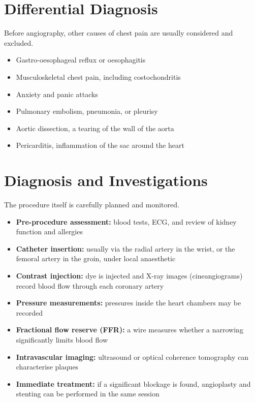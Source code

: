 \section*{Differential Diagnosis}
Before angiography, other causes of chest pain are usually considered and excluded.

\begin{itemize}
    \item Gastro-oesophageal reflux or oesophagitis
    \item Musculoskeletal chest pain, including costochondritis
    \item Anxiety and panic attacks
    \item Pulmonary embolism, pneumonia, or pleurisy
    \item Aortic dissection, a tearing of the wall of the aorta
    \item Pericarditis, inflammation of the sac around the heart
\end{itemize}

\section*{Diagnosis and Investigations}
The procedure itself is carefully planned and monitored.

\begin{itemize}
    \item \textbf{Pre-procedure assessment:} blood tests, ECG, and review of kidney function and allergies
    \item \textbf{Catheter insertion:} usually via the radial artery in the wrist, or the femoral artery in the groin, under local anaesthetic
    \item \textbf{Contrast injection:} dye is injected and X-ray images (cineangiograms) record blood flow through each coronary artery
    \item \textbf{Pressure measurements:} pressures inside the heart chambers may be recorded
    \item \textbf{Fractional flow reserve (FFR):} a wire measures whether a narrowing significantly limits blood flow
    \item \textbf{Intravascular imaging:} ultrasound or optical coherence tomography can characterise plaques
    \item \textbf{Immediate treatment:} if a significant blockage is found, angioplasty and stenting can be performed in the same session
\end{itemize}

